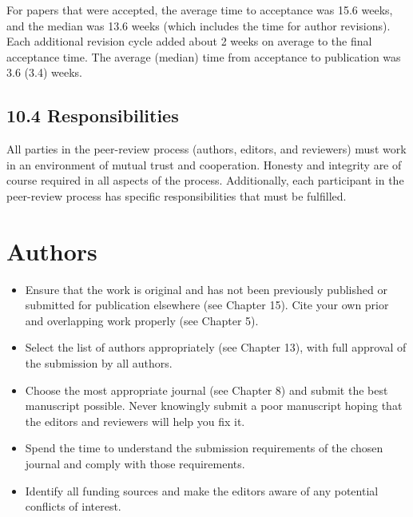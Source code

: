 For papers that were accepted, the average time to acceptance was 15.6 weeks, and the median was 13.6 weeks (which includes the time for author revisions). Each additional revision cycle added about 2 weeks on average to the final acceptance time. The average (median) time from acceptance to publication was 3.6 (3.4) weeks.

\subsection*{10.4 Responsibilities}
All parties in the peer-review process (authors, editors, and reviewers) must work in an environment of mutual trust and cooperation. Honesty and integrity are of course required in all aspects of the process. Additionally, each participant in the peer-review process has specific responsibilities that must be fulfilled.

\section*{Authors}
\begin{itemize}
  \item Ensure that the work is original and has not been previously published or submitted for publication elsewhere (see Chapter 15). Cite your own prior and overlapping work properly (see Chapter 5).
  \item Select the list of authors appropriately (see Chapter 13), with full approval of the submission by all authors.
  \item Choose the most appropriate journal (see Chapter 8) and submit the best manuscript possible. Never knowingly submit a poor manuscript hoping that the editors and reviewers will help you fix it.
  \item Spend the time to understand the submission requirements of the chosen journal and comply with those requirements.
  \item Identify all funding sources and make the editors aware of any potential conflicts of interest.
\end{itemize}

